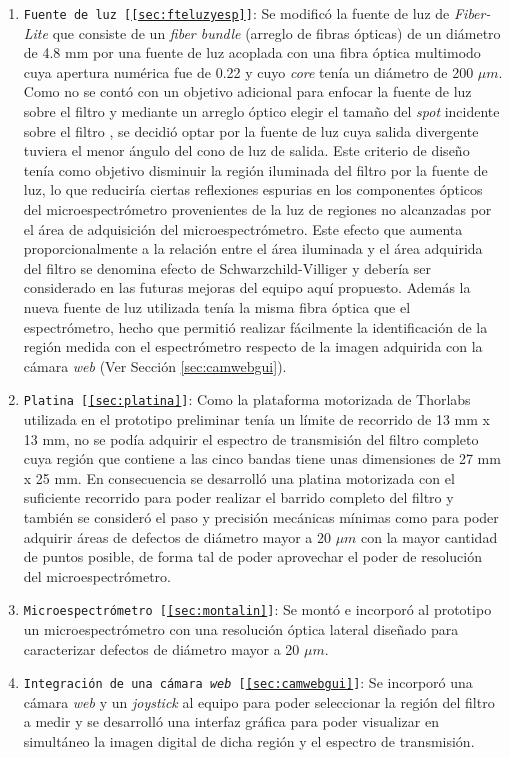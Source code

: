 \begin{enumerate}
\justifying
\item \texttt{Fuente de luz [\ref{sec:fteluzyesp}]}: Se modificó la fuente de luz de \textit{Fiber-Lite} que consiste de un \textit{fiber bundle} (arreglo de fibras ópticas) de un diámetro de 4.8 mm por una fuente de luz acoplada con una fibra óptica multimodo cuya apertura numérica fue de 0.22 y cuyo \textit{core} tenía un diámetro de 200 $\mu m$. Como no se contó con un objetivo adicional para enfocar la fuente de luz sobre el filtro y mediante un arreglo óptico elegir el tamaño del \textit{spot} incidente sobre el filtro , se decidió optar por la fuente de luz cuya salida divergente tuviera el menor ángulo del cono de luz de salida. Este criterio de diseño tenía como objetivo disminuir la región iluminada del filtro por la fuente de luz, lo que reduciría ciertas reflexiones espurias en los componentes ópticos del microespectrómetro provenientes de la luz de regiones no alcanzadas por el área de adquisición del microespectrómetro. Este efecto que aumenta proporcionalmente a la relación entre el área iluminada y el área adquirida del filtro se denomina efecto de Schwarzchild-Villiger \cite{Naora279} y debería ser considerado en las futuras mejoras del equipo aquí propuesto. Además la nueva fuente de luz utilizada tenía la misma fibra óptica que el espectrómetro, hecho que permitió realizar fácilmente la identificación de la región medida con el espectrómetro respecto de la imagen adquirida con la cámara \textit{web} (Ver Sección \ref{sec:camwebgui}).
\item \texttt{Platina [\ref{sec:platina}]}: Como la plataforma motorizada de Thorlabs utilizada en el prototipo preliminar tenía un límite de recorrido de 13 mm x 13 mm, no se podía adquirir el espectro de transmisión del filtro completo cuya región que contiene a las cinco bandas tiene unas dimensiones de 27 mm x 25 mm. En consecuencia se desarrolló una platina motorizada con el suficiente recorrido para poder realizar el barrido completo del filtro y también se consideró el paso y precisión mecánicas mínimas como para poder adquirir áreas de defectos de diámetro mayor a 20 $\mu m$ con la mayor cantidad de puntos posible, de forma tal de poder aprovechar el poder de resolución del microespectrómetro.
\item \texttt{Microespectrómetro [\ref{sec:montalin}]}: Se montó e incorporó al prototipo un microespectrómetro con una resolución óptica lateral diseñado para caracterizar defectos de diámetro mayor a 20 $\mu m$.
\item \texttt{Integración de una cámara \textit{web} [\ref{sec:camwebgui}]}: Se incorporó una cámara \textit{web} y un  \textit{joystick} al equipo para poder seleccionar la región del filtro a medir y se desarrolló una interfaz gráfica para poder visualizar en simultáneo la imagen digital de dicha región y el espectro de transmisión. 
\end{enumerate}

